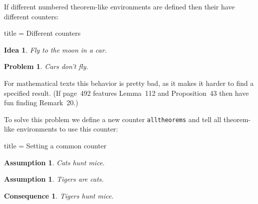 \documentclass[a4paper, 10pt, headings=standardclasses, oneside, bibliography=totocnumbered]{scrbook}
\begin{document}
If different numbered theorem-like environments are defined then their have different counters:
\begin{tcblisting}{title = {Different counters}}
\newtheorem{idea}{Idea}
\newtheorem{problem}{Problem}
\begin{idea}
  Fly to the moon in a car.
\end{idea}
\begin{problem}
  Cars don’t fly.
\end{problem}
\end{tcblisting}
For mathematical texts this behavior is pretty bad, as it makes it harder to find a specified result.
(If page~492 features Lemma~112 and Proposition~43 then have fun finding Remark~20.)

To solve this problem we define a new counter \texttt{alltheorems} and tell all theorem-like environments to use this counter:
\begin{tcblisting}{title = {Setting a common counter}}

\newtheorem{assumption}[alltheorems]{Assumption}
\newtheorem{consequence}[alltheorems]{Consequence}

\begin{assumption}
  Cats hunt mice.
\end{assumption}

\begin{assumption}
  Tigers are cats.
\end{assumption}

\begin{consequence}
  Tigers hunt mice.
\end{consequence}
\end{tcblisting}
\end{document}
